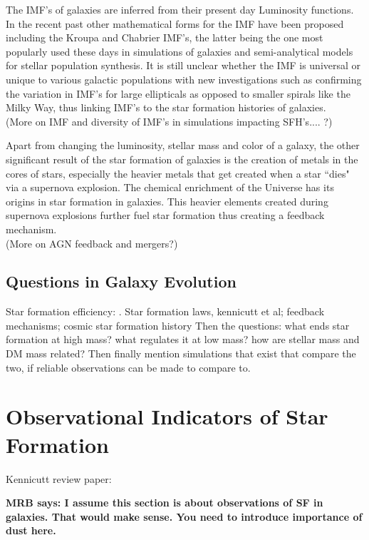 The IMF's of galaxies are inferred from their present day Luminosity functions. In the recent past other mathematical forms for the IMF have been proposed including the Kroupa \citep{2001MNRAS.322..231K} and Chabrier \citep{2003PASP..115..763C} IMF's, the latter being the one most popularly used these days in simulations of galaxies and semi-analytical models for stellar population synthesis. It is still unclear whether the IMF is universal or unique to various galactic populations with  new investigations such as \citet{2012Natur.484..485C} confirming the variation in IMF's for large ellipticals as opposed to smaller spirals like the Milky Way, thus linking IMF's to the star formation histories of galaxies.\\

(More on IMF and diversity of IMF's in simulations impacting SFH's.... ?)

Apart from changing the luminosity, stellar mass and color of a galaxy, the other significant result of the star formation of galaxies is the creation of metals in the cores of stars, especially the heavier metals that get created when a star ``dies" via a supernova explosion. The chemical enrichment of the Universe has its origins in star formation in galaxies. This heavier elements created during supernova explosions further fuel star formation thus creating a feedback mechanism.\\ 
(More on AGN feedback and mergers?)

\subsection{Questions in Galaxy Evolution}
Star formation efficiency: \citep{1538-3881-136-6-2782}.
Star formation laws, kennicutt et al; feedback mechanisms; cosmic star formation history
{Then the questions: what ends star formation at high mass?
what  regulates it at low mass? how are 
stellar mass and DM mass related? Then finally mention
simulations that exist that compare the two, if reliable
observations can be made to compare to.}

\section{Observational Indicators of Star Formation}

Kennicutt review paper: 

{\bf MRB says: I assume this section is about observations 
of SF in galaxies. That would make sense. You need to 
introduce importance of dust here.}

